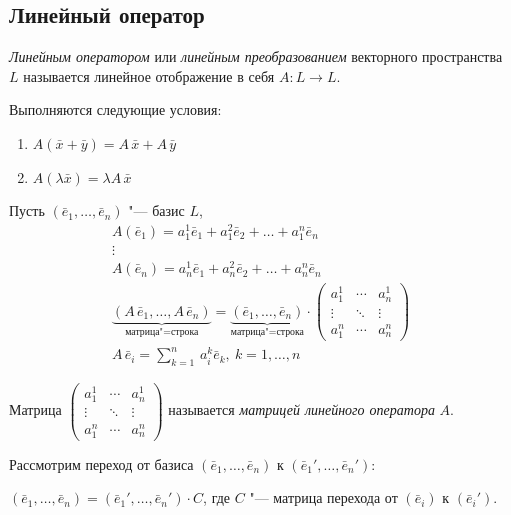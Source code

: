 \subsection*{Линейный оператор}
\begin{definition}
  \textit{Линейным оператором} или \textit{линейным преобразованием} векторного пространства $L$ называется линейное отображение в себя $A: L \to L$.
  
  Выполняются следующие условия:
  \begin{enumerate}
    \item $A(\bar{x} + \bar{y}) = A\, \bar{x} + A \, \bar{y}$
    \item $A(\lambda\bar{x}) = \lambda A\, \bar{x}$
  \end{enumerate}
\end{definition}

Пусть $(\bar{e}_1, \ldots, \bar{e}_n)$ "--- базис $L$,
\begin{gather*}
  A(\bar{e}_1) = a_1^1\bar{e}_1 + a_1^2\bar{e}_2 + \ldots + a_1^n\bar{e}_n \\
  \vdots \\
  A(\bar{e}_n) = a_n^1\bar{e}_1 + a_n^2\bar{e}_2 + \ldots + a_n^n \bar{e}_n \\
  \underbrace{(A\, \bar{e}_1, \ldots, A\, \bar{e}_n)}_{\text{матрица"=строка}} = \underbrace{(\bar{e}_1, \ldots, \bar{e}_n)}_{\text{матрица"=строка}} \cdot \begin{pmatrix}
    a_1^1 & \cdots & a_n^1 \\
    \vdots & \ddots & \vdots \\
    a_1^n & \cdots & a_n^n
  \end{pmatrix} \\
  A\, \bar{e}_i = \sum_{k = 1}^n \, a_i^k \bar{e}_k, ~ k = 1, \ldots, n 
\end{gather*}
\begin{definition}
  Матрица $\begin{pmatrix}
    a_1^1 & \cdots & a_n^1 \\
    \vdots & \ddots & \vdots \\
    a_1^n & \cdots & a_n^n
  \end{pmatrix}$ называется \textit{матрицей линейного оператора } $A$.
\end{definition}

Рассмотрим переход от базиса $(\bar{e}_1, \ldots, \bar{e}_n)$ к $(\bar{e}_1', \ldots, \bar{e}_n')$:

$(\bar{e}_1, \ldots, \bar{e}_n) = (\bar{e}_1', \ldots, \bar{e}_n') \cdot C$, где $C$ "--- матрица перехода от $(\bar{e}_i)$ к $(\bar{e}_i')$.

